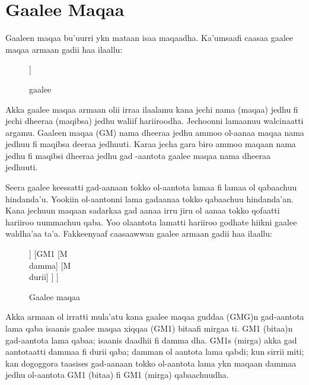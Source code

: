 \documentclass[11pt,b5paper]{book}
\begin{document}
\section{Gaalee Maqaa}
Gaaleen maqaa bu'uurri ykn mataan isaa maqaadha. Ka'umsaafi caasaa gaalee maqaa armaan gadii haa ilaallu:\\

\begin{figure}[H]
	\caption{gaalee}
	\centering
	\begin{forest}
		[GM \\ nama dheeraa
			[M\\nama]
			[IM\\dheeraa]
		]
	\end{forest}
\end{figure}
Akka gaalee maqaa armaan olii irraa ilaalamu kana jechi nama (maqaa) jedhu fi jechi dheeraa (maqibsa) jedhu waliif
hariiroodha. Jechoonni lamaanuu walcinaatti argamu. Gaaleen maqaa (GM) nama dheeraa jedhu ammoo ol-aanaa maqaa
nama jedhuu fi maqibsa deeraa jedhuuti. Karaa jecha gara biro ammoo maqaan nama jedhu fi maqibsi dheeraa jedhu gad
-aantota gaalee maqaa nama dheeraa jedhuuti.

Seera gaalee keessatti gad-aanaan tokko ol-aantota lamaa fi lamaa ol qabaachuu hindanda’u. Yookiin ol-aantonni lama gadaanaa tokko qabaachuu hindanda’an. Kana jechuun maqaan sadarkaa gad aanaa irru jiru ol aanaa tokko qofaatti hariiroo uummachuu qaba. Yoo olaantota lamatti hariiroo godhate hiikni gaalee waldha'aa ta'a. Fakkeenyaaf caasaawwan gaalee armaan gadii haa ilaallu:
\begin{figure}[H]										
	\caption{Gaalee maqaa}
	\centering
	\begin{forest}
		[GMG
			[GM1
				[M\\daadhii]
			[	M\\damma]
			]
			[GM1
				[M\\damma]
				[M\\durii]
			]
		]
	\end{forest}
\end{figure}

Akka armaan ol irratti mula’atu kana gaalee maqaa guddaa (GMG)n gad-aantota lama qaba isaanis gaalee maqaa xiqqaa
(GM1) bitaafi mirgaa ti. GM1 (bitaa)n gad-aantota lama qabaa; isaanis daadhii fi damma dha. GM1s (mirga) akka gad
aantotaatti dammaa fi durii qaba; damman ol aantota lama qabdi; kun sirrii miti; kan dogoggora taasises gad-aanaan tokko ol-aantota lama ykn maqaan dammaa jedhu ol-aantota GM1 (bitaa) fi GM1 (mirga) qabaachuudha.
\end{document}
